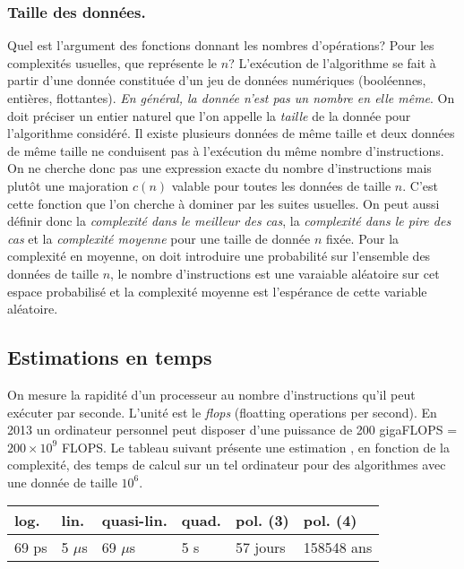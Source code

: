\subsubsection{Taille des données.}
Quel est l'argument des fonctions donnant les nombres d'opérations? Pour les complexités usuelles, que représente le $n$?\newline
L'exécution de l'algorithme se fait à partir d'une donnée constituée d'un jeu de données numériques (booléennes, entières, flottantes). \emph{En général, la donnée n'est pas un nombre en elle même}.\newline
On doit préciser un entier naturel que l'on appelle la \emph{taille} de la donnée pour l'algorithme considéré. Il existe plusieurs données de même taille et deux données de même taille ne conduisent pas à l'exécution du même nombre d'instructions. On ne cherche donc pas une expression exacte du nombre d'instructions mais plutôt une majoration $c(n)$ valable pour toutes les données de taille $n$. C'est cette fonction que l'on cherche à dominer par les suites usuelles. \newline
On peut aussi définir donc la \emph{complexité dans le meilleur des cas},  la \emph{complexité dans le pire des cas} et la \emph{complexité moyenne} pour une taille de donnée $n$ fixée.\newline
Pour la complexité en moyenne, on doit introduire une probabilité sur l'ensemble des données de taille $n$, le nombre d'instructions est une varaiable aléatoire sur cet espace probabilisé et la complexité moyenne est l'espérance de cette variable aléatoire.

\subsection{Estimations en temps}
On mesure la rapidité d'un processeur au nombre d'instructions qu'il peut exécuter par seconde. L'unité est le \emph{flops} (floatting operations per second).\newline
En 2013 un ordinateur personnel peut disposer d'une puissance de 200 gigaFLOPS = $200\times 10^{9}$ FLOPS. Le tableau suivant présente une estimation , en fonction de la complexité, des temps de calcul sur un tel ordinateur pour des algorithmes avec une donnée de taille $10^{6}$.
\begin{center}
\renewcommand{\arraystretch}{1.5}
\begin{tabular}{|l|l|l|l|l|l|} \hline
log. & lin. & quasi-lin. & quad. & pol. (3) & pol. (4)\\ \hline
69 ps & 5 $\mu$s & 69 $\mu$s & 5 s & 57 jours & 158548 ans \\ \hline
\end{tabular}
\end{center}


